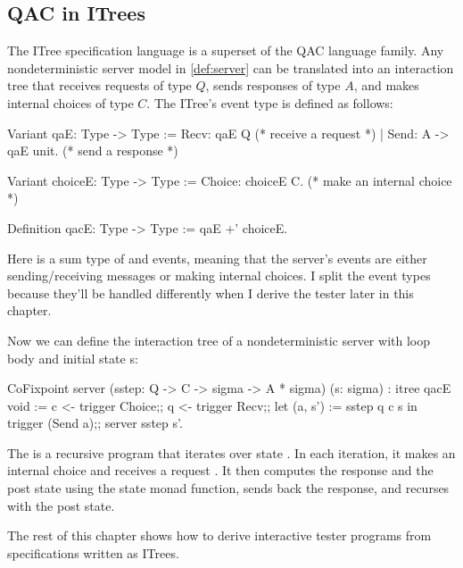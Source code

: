 \subsection{QAC in ITrees}
\label{sec:qac-itree}
The ITree specification language is a superset of the QAC language family.  Any
nondeterministic server model in \autoref{def:server} can be translated into an
interaction tree that receives requests of type $Q$, sends responses of type
$A$, and makes internal choices of type $C$.  The ITree's event type is defined
as follows:
\begin{coq}
  Variant qaE: Type -> Type :=
    Recv: qaE Q           (* receive a request *)
  | Send: A -> qaE unit.  (* send a response   *)

  Variant choiceE: Type -> Type :=
    Choice: choiceE C.    (* make an internal choice *)

  Definition qacE: Type -> Type := qaE +' choiceE.
\end{coq}
Here  is a sum type of  and  events, meaning
that the server's events are either sending/receiving messages or making
internal choices.  I split the event types because they'll be handled
differently when I derive the tester later in this chapter.

Now we can define the interaction tree of a nondeterministic server with loop
body  and initial state \ilc s:
\begin{coq}
  CoFixpoint server (sstep: Q -> C -> sigma -> A * sigma) (s: sigma) : itree qacE void :=
    c <- trigger Choice;;
    q <- trigger Recv;;
    let (a, s') := sstep q c s in
    trigger (Send a);;
    server sstep s'.
\end{coq}
The  is a recursive program that iterates over state .  In each iteration, it makes an internal choice  and
receives a request .  It then computes the response  and
the post state  using the  state monad function,
sends back the response, and recurses with the post state.

The rest of this chapter shows how to derive interactive tester programs from
specifications written as ITrees.
